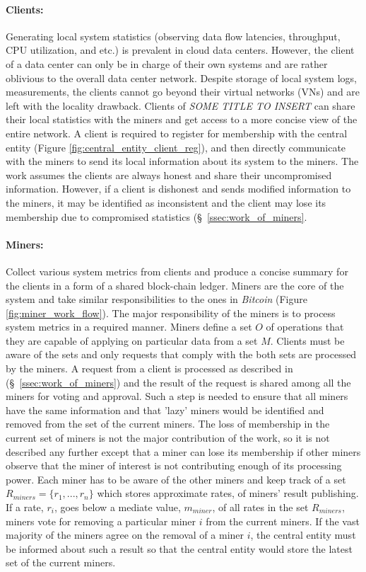 \documentclass{article}
\newcommand{\projTitle}{SOME TITLE TO INSERT\xspace}
\begin{document}
\paragraph{Clients:} Generating local system statistics (observing data flow latencies, throughput, CPU utilization, and etc.) is prevalent in cloud data centers. However, the client of a data center can only be in charge of their own systems and are rather oblivious to the overall data center network. Despite storage of local system logs, measurements, the clients cannot go beyond their virtual networks (VNs) and are left with the locality drawback. Clients of \textit{\projTitle} can share their local statistics with the miners and get access to a more concise view of the entire network. A client is required to register for membership with the central entity (Figure \ref{fig:central_entity_client_reg}), and then directly communicate with the miners to send its local information about its system to the miners. The work assumes the clients are always honest and share their uncompromised information. However, if a client is dishonest and sends modified information to the miners, it may be identified as inconsistent and the client may lose its membership due to compromised statistics (\S\ \ref{ssec:work_of_miners}.
\par

\paragraph{Miners:} Collect various system metrics from clients and produce a concise summary for the clients in a form of a shared block-chain ledger. Miners are the core of the system and take similar responsibilities to the ones in \textit{Bitcoin} (Figure \ref{fig:miner_work_flow}). The major responsibility of the miners is to process system metrics in a required manner. Miners define a set $O$ of operations that they are capable of applying on particular data from a set $M$. Clients must be aware of the sets and only
requests that comply with the both sets are processed by the miners. A request from a client is processed as described in (\S\ \ref{ssec:work_of_miners}) and the result of the request is shared among all the miners for voting and approval. Such a step is needed to
ensure that all miners have the same information and that 'lazy' miners would be identified and removed from the set of the current miners. The loss of membership in the current set of miners is not the major contribution of the work, so it is not described any further except
that a miner can lose its membership if other miners observe that the miner of interest is not contributing enough of its processing power. Each miner has to be aware of the other miners and keep track of a set $R_{miners} = \{r_1, ..., r_n\}$ which stores approximate rates,
of  miners' result publishing. If a rate, $r_i$, goes below a mediate value, $m_{miner}$, of all rates in the set $R_{miners}$, miners vote for removing a particular miner $i$ from the current miners. If the vast majority of the miners agree on the removal of a miner $i$,
the central entity must be informed about such a result so that the central entity would store the latest set of the current miners.
\par
\end{document}
